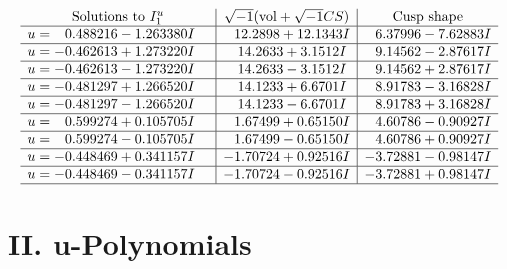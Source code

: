 \documentclass[1p]{elsarticle_modified}
\theoremstyle{definition}
\newcommand{\I}{\sqrt{-1}}
\begin{document}
$$\begin{array}{c|c|c}
\text{Solutions to }I^u_{1}& \I (\text{vol} + \sqrt{-1}CS) & \text{Cusp shape}\\
 \hline 
\begin{aligned}
u &= \phantom{-}0.488216 - 1.263380 I\end{aligned}
 & \phantom{-}12.2898 + 12.1343 I & \phantom{-}6.37996 - 7.62883 I \\ \hline\begin{aligned}
u &= -0.462613 + 1.273220 I\end{aligned}
 & \phantom{-}14.2633 + 3.1512 I & \phantom{-}9.14562 - 2.87617 I \\ \hline\begin{aligned}
u &= -0.462613 - 1.273220 I\end{aligned}
 & \phantom{-}14.2633 - 3.1512 I & \phantom{-}9.14562 + 2.87617 I \\ \hline\begin{aligned}
u &= -0.481297 + 1.266520 I\end{aligned}
 & \phantom{-}14.1233 + 6.6701 I & \phantom{-}8.91783 - 3.16828 I \\ \hline\begin{aligned}
u &= -0.481297 - 1.266520 I\end{aligned}
 & \phantom{-}14.1233 - 6.6701 I & \phantom{-}8.91783 + 3.16828 I \\ \hline\begin{aligned}
u &= \phantom{-}0.599274 + 0.105705 I\end{aligned}
 & \phantom{-}1.67499 + 0.65150 I & \phantom{-}4.60786 - 0.90927 I \\ \hline\begin{aligned}
u &= \phantom{-}0.599274 - 0.105705 I\end{aligned}
 & \phantom{-}1.67499 - 0.65150 I & \phantom{-}4.60786 + 0.90927 I \\ \hline\begin{aligned}
u &= -0.448469 + 0.341157 I\end{aligned}
 & -1.70724 + 0.92516 I & -3.72881 - 0.98147 I \\ \hline\begin{aligned}
u &= -0.448469 - 0.341157 I\end{aligned}
 & -1.70724 - 0.92516 I & -3.72881 + 0.98147 I\\
 \hline 
 \end{array}$$\newpage
\newpage\renewcommand{\arraystretch}{1}
\centering \section*{ II. u-Polynomials}
\end{document}

